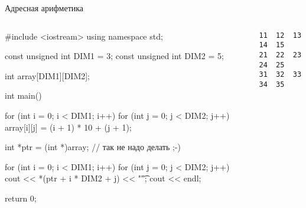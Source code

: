 \documentclass[
    9pt,
    hyperref={pdfencoding=unicode}
    ]{beamer}
\theoremstyle{definition}
\begin{document}
\begin{frame}[fragile]{Адресная арифметика}
    \footnotesize
    \begin{columns}
        \begin{column}{0.7\textwidth}
            \begin{cppcode}
                #include <iostream>        
                using namespace std;   
                
                const unsigned int DIM1 = 3;
                const unsigned int DIM2 = 5;
                
                int array[DIM1][DIM2];
                
                int main() {            
                    for (int i = 0; i < DIM1; i++) {
                        for (int j = 0; j < DIM2; j++) {
                            array[i][j] = (i + 1) * 10 + (j + 1);
                        }
                    }
                    
                    int *ptr = (int *)array;    // так не надо делать ;-)
                    
                    for (int i = 0; i < DIM1; i++) {
                        for (int j = 0; j < DIM2; j++) {
                            cout << *(ptr + i * DIM2 + j) << "\t";
                        }
                        cout << endl;
                    }
                    
                    return 0;
                }
            \end{cppcode}
        \end{column}
        \begin{column}{0.3\textwidth}
            \begin{verbatim}
11  12  13  14  15
21  22  23  24  25
31  32  33  34  35
            \end{verbatim}
        \end{column}
    \end{columns}
    
\end{frame}
\end{document}
